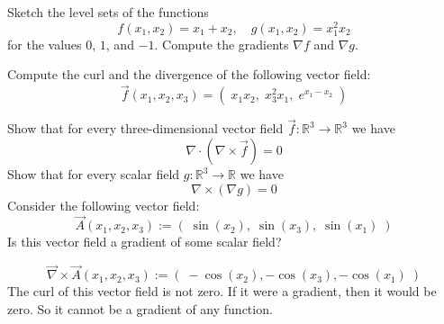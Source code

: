 \documentclass[11pt]{article}
\begin{document}
\def\hidesolutions{}


\begin{exercise}
	Sketch the level sets of the functions 
    \[
        f(x_1,x_2) = x_1 + x_2, \quad g(x_1,x_2) = x_1^2 x_2 
    \]
    for the values $0$, $1$, and $-1$.
    Compute the gradients $\nabla f$ and  $\nabla g$.
\end{exercise}

\begin{solution}
     
\end{solution}


\begin{exercise}
	Compute the curl and the divergence of the following vector field:
    \[
        \vec{f}(x_1,x_2,x_3) = \left( \; x_1 x_2, \; x_3^2 x_1,\;  e^{x_1 - x_2} \; \right)
    \]
\end{exercise}

\begin{solution}
     
\end{solution}





\begin{exercise}
	Show that for every three-dimensional vector field $\vec{f} \colon \mathbb{R}^3 \to \mathbb{R}^3$ we have 
    \[
        \nabla \cdot \left( \nabla \times \vec{f} \right) = 0
    \]
    Show that for every scalar field $g \colon \mathbb{R}^3 \to \mathbb{R}$ we have 
    \[
        \nabla \times \left( \nabla g \right) = 0
    \]
    Consider the following vector field:
    \[
        \vec{A}(x_1,x_2,x_3) := \left( \; \sin(x_2),  \; \sin(x_3), \; \sin(x_1) \; \right)
    \]
    Is this vector field a gradient of some scalar field?
\end{exercise}

\begin{solution}
    \[
        \vec{\nabla} \times \vec{A}(x_1,x_2,x_3)
        :=
        \left(\;
            -\cos(x_2),  -\cos(x_3), -\cos(x_1)
        \;\right)
    \]
    The curl of this vector field is not zero. 
    If it were a gradient, then it would be zero. 
    So it cannot be a gradient of any function.
     
\end{solution}
\end{document}
